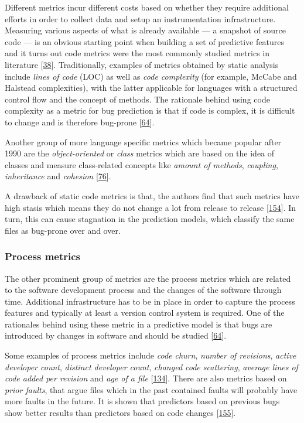 \documentclass[]{book}
\begin{document}
Different metrics incur different costs based on whether they require
additional efforts in order to collect data and setup an instrumentation
infrastructure. Measuring various aspects of what is already available
--- a snapshot of source code --- is an obvious starting point when
building a set of predictive features and it turns out code metrics were
the most commonly studied metrics in literature
{[}\protect\hyperlink{ref-Catal2009review}{38}{]}. Traditionally,
examples of metrics obtained by static analysis include \emph{lines of
code} (LOC) as well as \emph{code complexity} (for example, McCabe and
Halstead complexities), with the latter applicable for languages with a
structured control flow and the concept of methods. The rationale behind
using code complexity as a metric for bug prediction is that if code is
complex, it is difficult to change and is therefore bug-prone
{[}\protect\hyperlink{ref-DAmbros2012}{64}{]}.

Another group of more language specific metrics which became popular
after 1990 are the \emph{object-oriented} or \emph{class} metrics which
are based on the idea of classes and measure class-related concepts like
\emph{amount of methods}, \emph{coupling}, \emph{inheritance} and
\emph{cohesion} {[}\protect\hyperlink{ref-Gyimothy2005}{76}{]}.

A drawback of static code metrics is that, the authors find that such
metrics have high stasis which means they do not change a lot from
release to release {[}\protect\hyperlink{ref-Rahman2013}{154}{]}. In
turn, this can cause stagnation in the prediction models, which classify
the same files as bug-prone over and over.

\subsubsection{Process metrics}\label{process-metrics}

The other prominent group of metrics are the process metrics which are
related to the software development process and the changes of the
software through time. Additional infrastructure has to be in place in
order to capture the process features and typically at least a version
control system is required. One of the rationales behind using these
metric in a predictive model is that bugs are introduced by changes in
software and should be studied
{[}\protect\hyperlink{ref-DAmbros2012}{64}{]}.

Some examples of process metrics include \emph{code churn}, \emph{number
of revisions}, \emph{active developer count}, \emph{distinct developer
count}, \emph{changed code scattering}, \emph{average lines of code
added per revision} and \emph{age of a file}
{[}\protect\hyperlink{ref-Moser2008}{134}{]}. There are also metrics
based on \emph{prior faults}, that argue files which in the past
contained faults will probably have more faults in the future. It is
shown that predictors based on previous bugs show better results than
predictors based on code changes
{[}\protect\hyperlink{ref-rahman2011}{155}{]}.
\end{document}
